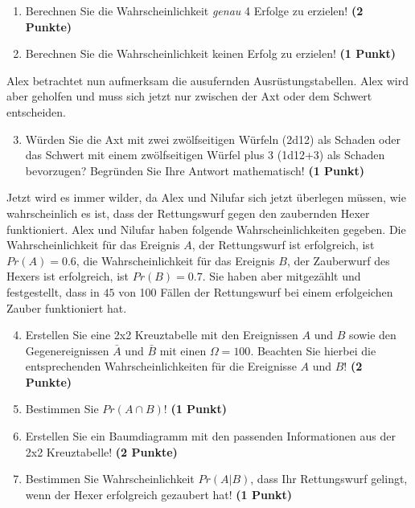 \documentclass[a4paper, 9pt]{scrartcl}\usepackage[]{graphicx}\usepackage[]{xcolor}
\begin{document}
\begin{enumerate}
\item Berechnen Sie die Wahrscheinlichkeit \textit{genau} 4 Erfolge zu erzielen!  \textbf{(2 Punkte)}
\item Berechnen Sie die Wahrscheinlichkeit keinen Erfolg zu erzielen! \textbf{(1 Punkt)}
\end{enumerate}

Alex betrachtet nun aufmerksam die ausufernden Ausrüstungstabellen. Alex wird aber geholfen und muss sich jetzt nur zwischen der Axt oder dem Schwert entscheiden.

\begin{enumerate}
  \setcounter{enumi}{2}
\item Würden Sie die Axt mit zwei zwölfseitigen Würfeln (2d12) als Schaden oder das Schwert mit einem zwölfseitigen Würfel plus 3 (1d12+3) als Schaden bevorzugen? Begründen Sie Ihre Antwort mathematisch! \textbf{(1 Punkt)}
\end{enumerate}

Jetzt wird es immer wilder, da Alex und Nilufar sich jetzt überlegen müssen, wie wahrscheinlich es ist, dass der Rettungswurf gegen den zaubernden Hexer funktioniert. Alex und Nilufar haben folgende Wahrscheinlichkeiten gegeben. Die Wahrscheinlichkeit für das Ereignis $A$, der Rettungswurf ist erfolgreich, ist $Pr(A) = 0.6$, die Wahrscheinlichkeit für das Ereignis $B$, der Zauberwurf des Hexers ist erfolgreich, ist $Pr(B) = 0.7$. Sie haben aber mitgezählt und festgestellt, dass in $45$ von 100 Fällen der Rettungswurf bei einem erfolgeichen Zauber funktioniert hat.  

\begin{enumerate}
  \setcounter{enumi}{3}
\item Erstellen Sie eine 2x2 Kreuztabelle mit den Ereignissen $A$ und $B$ sowie den Gegenereignissen $\bar{A}$ und $\bar{B}$ mit einen $\Omega = 100$. Beachten Sie hierbei die entsprechenden Wahrscheinlichkeiten für die Ereignisse $A$ und $B$! \textbf{(2 Punkte)}
\item Bestimmen Sie $Pr(A \cap B)$! \textbf{(1 Punkt)}
\item Erstellen Sie ein Baumdiagramm mit den passenden Informationen aus der 2x2 Kreuztabelle! \textbf{(2 Punkte)}
\item Bestimmen Sie Wahrscheinlichkeit $Pr(A|B)$, dass Ihr Rettungswurf gelingt, wenn der Hexer erfolgreich gezaubert hat! \textbf{(1 Punkt)}
\end{enumerate}
\end{document}
